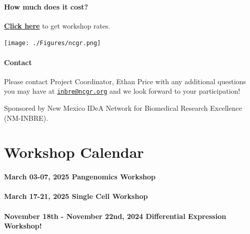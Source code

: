 \documentclass[
]{book}
\begin{document}
\hypertarget{how-much-does-it-cost-1}{%
\subsubsection*{How much does it cost?}\label{how-much-does-it-cost-1}}

\href{https://inbre.ncgr.org/ncgr-workshops/workshop-rates.html}{\textbf{Click here}} to get workshop rates.

\texttt{[image: ./Figures/ncgr.png]}

\hypertarget{contact}{%
\subsubsection*{Contact}\label{contact}}

Please contact Project Coordinator, Ethan Price with any additional questions you may have at \href{mailto:inbre@ncgr.org}{\nolinkurl{inbre@ncgr.org}} and we look forward to your participation!

Sponsored by New Mexico IDeA Network for Biomedical Research Excellence (NM-INBRE).

\hypertarget{workshop-calendar}{%
\chapter*{Workshop Calendar}\label{workshop-calendar}}

\hypertarget{march-03-07-2025-pangenomics-workshop}{%
\subsubsection*{March 03-07, 2025 \textbar{} Pangenomics Workshop}\label{march-03-07-2025-pangenomics-workshop}}

\hypertarget{march-17-21-2025-single-cell-workshop}{%
\subsubsection*{March 17-21, 2025 \textbar{} Single Cell Workshop}\label{march-17-21-2025-single-cell-workshop}}

\hypertarget{november-18th---november-22nd-2024-differential-expression-workshop}{%
\subsubsection*{November 18th - November 22nd, 2024 \textbar{} Differential Expression Workshop!}\label{november-18th---november-22nd-2024-differential-expression-workshop}}
\end{document}

